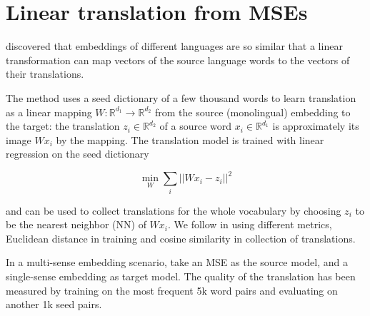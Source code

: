 \documentclass[11pt]{article}
\newcommand{\Ro}{\mathbb{R}^{d_1}}
\newcommand{\Rt}{\mathbb{R}^{d_2}}
\begin{document}
\section{Linear translation from MSEs}

 \cite{Mikolov:2013x} discovered that embeddings of different languages are so
 similar that a linear transformation can map vectors of the source language
 words to the vectors of their translations.

The method uses a seed dictionary of a few thousand words to learn translation
as a linear mapping $W: \mathbb{R}^{d_1}\rightarrow \mathbb{R}^{d_2}$ from the
source (monolingual) embedding to the target: the translation $z_i \in \Rt$ of
a source word $x_i \in \Ro$ is approximately its image $Wx_i$ by the mapping.
The translation model is trained with linear regression on the seed dictionary

\[\min_W \sum_i || Wx_i - z_i ||^2 \]

\noindent and can be used to collect translations for the whole vocabulary by
choosing $z_i$ to be the nearest neighbor (NN) of $Wx_i$.
We follow \cite{Mikolov:2013x} in using different metrics, Euclidean
 distance in training and cosine similarity in collection of translations.


In a multi-sense embedding scenario, \cite{Borbely:2016} take an MSE as the
source model, and a single-sense embedding as target model.  The quality of the
translation has been measured by training on the most frequent 5k word pairs
and evaluating on another 1k seed pairs.



% 
% 
% 
% 
\end{document}
